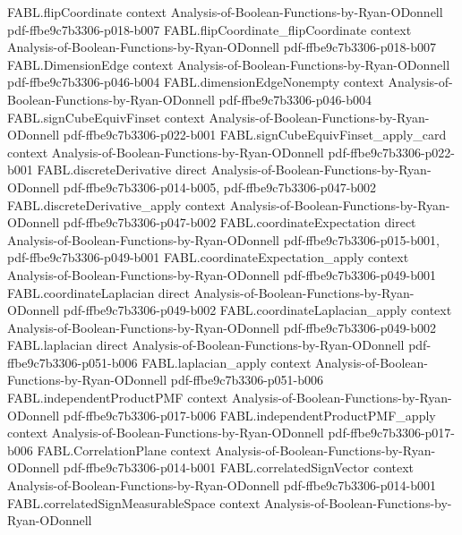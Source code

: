 \begin{theorem}
\proofstep
  {FABL.flipCoordinate}
  {context}
  {Analysis-of-Boolean-Functions-by-Ryan-ODonnell}
  {pdf-ffbe9c7b3306-p018-b007}
\proofstep
  {FABL.flipCoordinate_flipCoordinate}
  {context}
  {Analysis-of-Boolean-Functions-by-Ryan-ODonnell}
  {pdf-ffbe9c7b3306-p018-b007}
\proofstep
  {FABL.DimensionEdge}
  {context}
  {Analysis-of-Boolean-Functions-by-Ryan-ODonnell}
  {pdf-ffbe9c7b3306-p046-b004}
\proofstep
  {FABL.dimensionEdgeNonempty}
  {context}
  {Analysis-of-Boolean-Functions-by-Ryan-ODonnell}
  {pdf-ffbe9c7b3306-p046-b004}
\proofstep
  {FABL.signCubeEquivFinset}
  {context}
  {Analysis-of-Boolean-Functions-by-Ryan-ODonnell}
  {pdf-ffbe9c7b3306-p022-b001}
\proofstep
  {FABL.signCubeEquivFinset_apply_card}
  {context}
  {Analysis-of-Boolean-Functions-by-Ryan-ODonnell}
  {pdf-ffbe9c7b3306-p022-b001}
\proofstep
  {FABL.discreteDerivative}
  {direct}
  {Analysis-of-Boolean-Functions-by-Ryan-ODonnell}
  {pdf-ffbe9c7b3306-p014-b005,
    pdf-ffbe9c7b3306-p047-b002}
\proofstep
  {FABL.discreteDerivative_apply}
  {context}
  {Analysis-of-Boolean-Functions-by-Ryan-ODonnell}
  {pdf-ffbe9c7b3306-p047-b002}
\proofstep
  {FABL.coordinateExpectation}
  {direct}
  {Analysis-of-Boolean-Functions-by-Ryan-ODonnell}
  {pdf-ffbe9c7b3306-p015-b001,
    pdf-ffbe9c7b3306-p049-b001}
\proofstep
  {FABL.coordinateExpectation_apply}
  {context}
  {Analysis-of-Boolean-Functions-by-Ryan-ODonnell}
  {pdf-ffbe9c7b3306-p049-b001}
\proofstep
  {FABL.coordinateLaplacian}
  {direct}
  {Analysis-of-Boolean-Functions-by-Ryan-ODonnell}
  {pdf-ffbe9c7b3306-p049-b002}
\proofstep
  {FABL.coordinateLaplacian_apply}
  {context}
  {Analysis-of-Boolean-Functions-by-Ryan-ODonnell}
  {pdf-ffbe9c7b3306-p049-b002}
\proofstep
  {FABL.laplacian}
  {direct}
  {Analysis-of-Boolean-Functions-by-Ryan-ODonnell}
  {pdf-ffbe9c7b3306-p051-b006}
\proofstep
  {FABL.laplacian_apply}
  {context}
  {Analysis-of-Boolean-Functions-by-Ryan-ODonnell}
  {pdf-ffbe9c7b3306-p051-b006}
\proofstep
  {FABL.independentProductPMF}
  {context}
  {Analysis-of-Boolean-Functions-by-Ryan-ODonnell}
  {pdf-ffbe9c7b3306-p017-b006}
\proofstep
  {FABL.independentProductPMF_apply}
  {context}
  {Analysis-of-Boolean-Functions-by-Ryan-ODonnell}
  {pdf-ffbe9c7b3306-p017-b006}
\proofstep
  {FABL.CorrelationPlane}
  {context}
  {Analysis-of-Boolean-Functions-by-Ryan-ODonnell}
  {pdf-ffbe9c7b3306-p014-b001}
\proofstep
  {FABL.correlatedSignVector}
  {context}
  {Analysis-of-Boolean-Functions-by-Ryan-ODonnell}
  {pdf-ffbe9c7b3306-p014-b001}
\proofstep
  {FABL.correlatedSignMeasurableSpace}
  {context}
  {Analysis-of-Boolean-Functions-by-Ryan-ODonnell}

\end{theorem}
